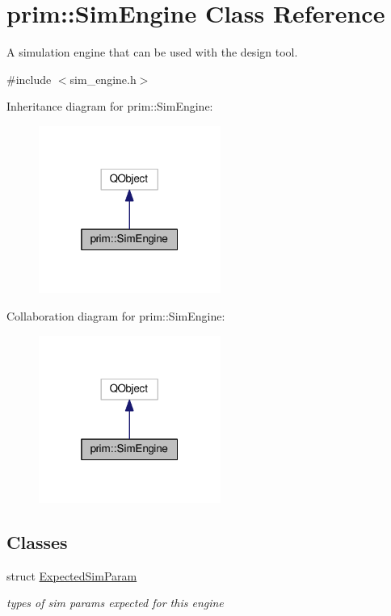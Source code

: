 \hypertarget{classprim_1_1SimEngine}{}\section{prim\+:\+:Sim\+Engine Class Reference}
\label{classprim_1_1SimEngine}


A simulation engine that can be used with the design tool.  




{\ttfamily \#include $<$sim\+\_\+engine.\+h$>$}



Inheritance diagram for prim\+:\+:Sim\+Engine\+:\nopagebreak
\begin{figure}[H]
\begin{center}
\leavevmode
\includegraphics[width=169pt]{classprim_1_1SimEngine__inherit__graph}
\end{center}
\end{figure}


Collaboration diagram for prim\+:\+:Sim\+Engine\+:\nopagebreak
\begin{figure}[H]
\begin{center}
\leavevmode
\includegraphics[width=169pt]{classprim_1_1SimEngine__coll__graph}
\end{center}
\end{figure}
\subsection*{Classes}
\begin{DoxyCompactItemize}
\item 
struct \hyperlink{structprim_1_1SimEngine_1_1ExpectedSimParam}{Expected\+Sim\+Param}
\begin{DoxyCompactList}\small\item\em types of sim params expected for this engine \end{DoxyCompactList}\end{DoxyCompactItemize}
